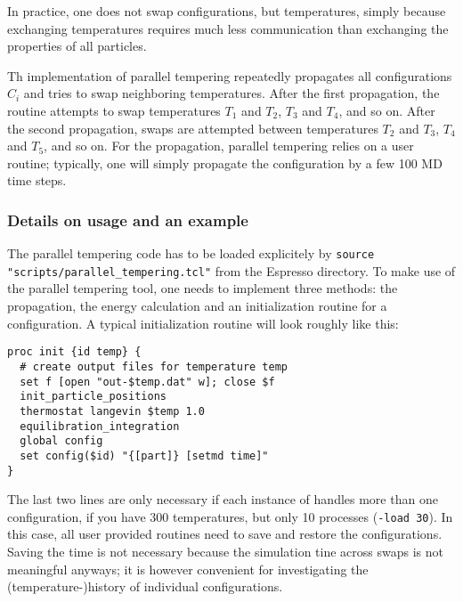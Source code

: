 In practice, one does not swap configurations, but temperatures, simply because exchanging
temperatures requires much less communication than exchanging the properties of all particles.

Th \es{} implementation of parallel tempering repeatedly propagates all configurations $C_i$ and
tries to swap neighboring temperatures. After the first propagation, the routine attempts to swap
temperatures $T_1$ and $T_2$, $T_3$ and $T_4$, and so on. After the second propagation, swaps are
attempted between temperatures $T_2$ and $T_3$, $T_4$ and $T_5$, and so on.  For the propagation,
parallel tempering relies on a user routine; typically, one will simply propagate the configuration
by a few 100 MD time steps.

\subsubsection{Details on usage and an example}

The parallel tempering code has to be loaded explicitely by \texttt{source
  "scripts/parallel_tempering.tcl"} from the Espresso directory. To make use of the parallel
tempering tool, one needs to implement three methods: the propagation, the energy calculation and
an initialization routine for a configuration. A typical initialization routine will look roughly
like this:
\begin{verbatim}
proc init {id temp} {
  # create output files for temperature temp
  set f [open "out-$temp.dat" w]; close $f
  init_particle_positions
  thermostat langevin $temp 1.0
  equilibration_integration
  global config
  set config($id) "{[part]} [setmd time]"
}
\end{verbatim}
The last two lines are only necessary if each instance of \es{} handles more than one
configuration, \eg if you have 300 temperatures, but only 10 \es{} processes
(\ie \texttt{-load 30}).  In this case, all
user provided routines need to save and restore the configurations. Saving the time is not
necessary because the simulation tine across swaps is not meaningful anyways; it is however
convenient for investigating the (temperature-)history of individual configurations.

